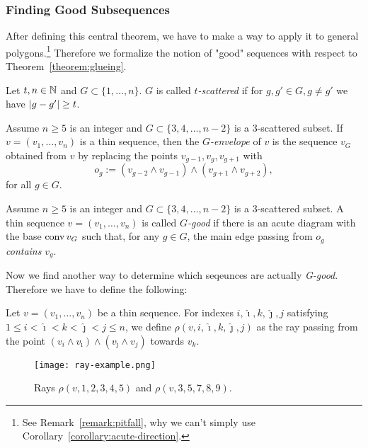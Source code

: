 \subsubsection{Finding Good Subsequences}

After defining this central theorem, we have to make a way to apply it to general polygons.\footnote{See Remark~\ref{remark:pitfall}, why we can't simply use Corollary~\ref{corollary:acute-direction}.}
Therefore we formalize the notion of "good" sequences with respect to Theorem~\ref{theorem:glueing}.

\begin{definition}
  Let $t, n \in \mathbb{N}$ and $G \subset \{1,\dots,n\}$. $G$ is called $t$\emph{-scattered} if for $g, g' \in G, g \neq g'$ we have $\lvert g-g'\rvert \geq t$.
\end{definition}

\begin{definition}[G-envelope]\label{definition:g-envelope}
  Assume $n\geq 5$ is an integer and $G\subset\{3,4,\dots,n-2\}$ is a $3$-scattered subset. If $v=(v_1,\dots,v_n)$ is a thin sequence, then the $G$\emph{-envelope} of $v$ is the sequence $v_G$ obtained from $v$ by replacing the points $v_{g-1}, v_g, v_{g+1}$ with $$o_g:=(v_{g-2}\wedge v_{g-1})\wedge (v_{g+1}\wedge v_{g+2}),$$ for all $g\in G$.
\end{definition}

\begin{definition}[G-good]
  Assume $n\geq 5$ is an integer and $G\subset\{3,4,\dots,n-2\}$ is a $3$-scattered subset. A thin sequence $v=(v_1,\dots,v_n)$ is called $G$\emph{-good} if there is an acute diagram with the base $\operatorname{conv} v_G$ such that, for any $g\in G$, the main edge passing from $o_g$ \emph{contains} $v_g$.
\end{definition}

Now we find another way to determine which seqeunces are actually \emph{G-good}. Therefore we have to define the following:

\begin{definition}
  Let $v=(v_1,\dots,v_n)$ be a thin sequence. For indexes $i,\hat{\imath},k, \hat{\jmath}, j$ satisfying $1\leq i<\hat{\imath}<k<\hat{\jmath}<j\leq n$, we define $\rho(v,i,\hat{\imath},k, \hat{\jmath}, j)$ as the ray passing from the point $(v_i\wedge v_{\hat{\imath}})\wedge(v_{\hat{\jmath}}\wedge v_j)$ towards $v_k$. 
\end{definition}

\begin{figure}[h]
  \centering
  \texttt{[image: ray-example.png]}
  \caption{Rays $\rho(v,1,2,3,4,5)$ and $\rho(v,3,5,7,8,9)$. \cite[Figure 5]{shitov2020sublinear}}
  \label{fig:ray-example}
\end{figure}

